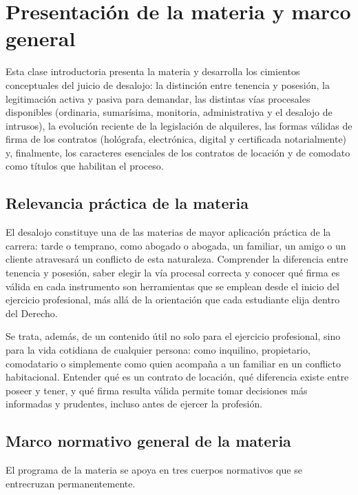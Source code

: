 \documentclass[12pt,oneside]{book}
\begin{document}
\pagestyle{fancy}
\frontmatter
\tableofcontents

\mainmatter

\chapter{Presentación de la materia y marco general}
\label{cap:presentacion}

Esta clase introductoria presenta la materia y desarrolla los cimientos conceptuales del juicio de desalojo: la distinción entre tenencia y posesión, la legitimación activa y pasiva para demandar, las distintas vías procesales disponibles (ordinaria, sumarísima, monitoria, administrativa y el desalojo de intrusos), la evolución reciente de la legislación de alquileres, las formas válidas de firma de los contratos (hológrafa, electrónica, digital y certificada notarialmente) y, finalmente, los caracteres esenciales de los contratos de locación y de comodato como títulos que habilitan el proceso.

\section{Relevancia práctica de la materia}

El desalojo constituye una de las materias de mayor aplicación práctica de la carrera: tarde o temprano, como abogado o abogada, un familiar, un amigo o un cliente atravesará un conflicto de esta naturaleza. Comprender la diferencia entre tenencia y posesión, saber elegir la vía procesal correcta y conocer qué firma es válida en cada instrumento son herramientas que se emplean desde el inicio del ejercicio profesional, más allá de la orientación que cada estudiante elija dentro del Derecho.

Se trata, además, de un contenido útil no solo para el ejercicio profesional, sino para la vida cotidiana de cualquier persona: como inquilino, propietario, comodatario o simplemente como quien acompaña a un familiar en un conflicto habitacional. Entender qué es un contrato de locación, qué diferencia existe entre poseer y tener, y qué firma resulta válida permite tomar decisiones más informadas y prudentes, incluso antes de ejercer la profesión.

\section{Marco normativo general de la materia}

El programa de la materia se apoya en tres cuerpos normativos que se entrecruzan permanentemente.
\end{document}
